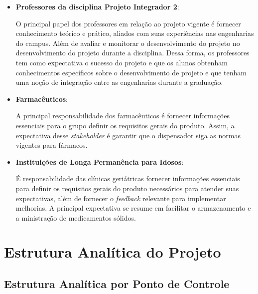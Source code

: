 \begin{apendicesenv}
\begin{itemize}
\item \textbf{Professores da disciplina Projeto Integrador 2}:

O principal papel dos professores em relação ao projeto vigente é fornecer conhecimento teórico e prático, aliados com suas experiências nas engenharias do campus. Além de avaliar e monitorar o desenvolvimento do projeto no desenvolvimento do projeto durante a disciplina. Dessa forma, os professores tem como expectativa o sucesso do projeto e que os alunos obtenham conhecimentos específicos sobre o desenvolvimento de projeto e que tenham uma noção de integração entre as engenharias durante a graduação.
\item \textbf{Farmacêuticos}:

A principal responsabilidade dos farmacêuticos é fornecer informações essenciais para o grupo definir os requisitos gerais do produto. Assim, a expectativa desse \textit{stakeholder} é garantir que o dispensador siga as normas vigentes para fármacos.

\item \textbf{Instituições de Longa Permanência para Idosos}:

É responsabilidade das clínicas geriátricas fornecer informações essenciais para definir os requisitos gerais do produto necessários para atender suas expectativas, além de fornecer o \textit{feedback} relevante para implementar melhorias.  A principal expectativa se resume em facilitar o armazenamento e a ministração de medicamentos sólidos.
\end{itemize}



\chapter{Estrutura Analítica do Projeto}
\label{EAP_app}
\section{Estrutura Analítica por Ponto de Controle}


\end{apendicesenv}
